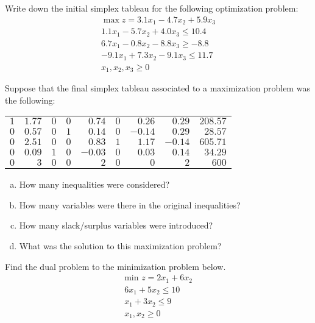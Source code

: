 \documentclass[11pt,letterpaper]{article}
\begin{document}

 Write down the initial simplex tableau for the following optimization problem:
	\[
	\begin{gathered}
	\max z= 3.1x_1 - 4.7x_2 + 5.9x_3 \\
	1.1x_1 - 5.7x_2 + 4.0x_3 \leq 10.4 \\
	6.7x_1 - 0.8x_2 - 8.8x_3 \geq -8.8 \\
	-9.1x_1 + 7.3x_2 - 9.1x_3 \leq 11.7 \\
	x_1, x_2, x_3 \geq 0
	\end{gathered}
	\] 



\newpage



 Suppose that the final simplex tableau associated to a maximization problem was the following: \par
	\begin{table}[!ht]
	\centering
	\begin{tabular}{rrrrrrrrr}
	$1$ & $1.77$ & $0$ & $0$ & $0.74$ & $0$ & $0.26$ & $0.29$ & $208.57$ \\
	$0$ & $0.57$ & $0$ & $1$ & $0.14$ & $0$ & $-0.14$ & $0.29$ & $28.57$ \\
	$0$ & $2.51$ & $0$ & $0$ & $0.83$ & $1$ & $1.17$ & $-0.14$ & $605.71$ \\
	$0$ & $0.09$ & $1$ & $0$ & $-0.03$ & $0$ & $0.03$ & $0.14$ & $34.29$ \\
	$0$ & $3$ & $0$& $0$& $2$ & $0$ & $0$ & $2$ & $600$
	\end{tabular}
	\end{table} \par



\begin{enumerate}[(a)]
\item How many inequalities were considered?
\item How many variables were there in the original inequalities?
\item How many slack/surplus variables were introduced?
\item What was the solution to this maximization problem?
\end{enumerate} 




\newpage



 Find the dual problem to the minimization problem below. 
	\[
	\begin{gathered}
	\text{min } z= 2x_1 + 6x_2 \\
	6x_1 + 5x_2 \leq 10 \\
	x_1 + 3x_2 \leq 9 \\ 
	x_1, x_2 \geq 0
	\end{gathered}
	\]
\end{document}

